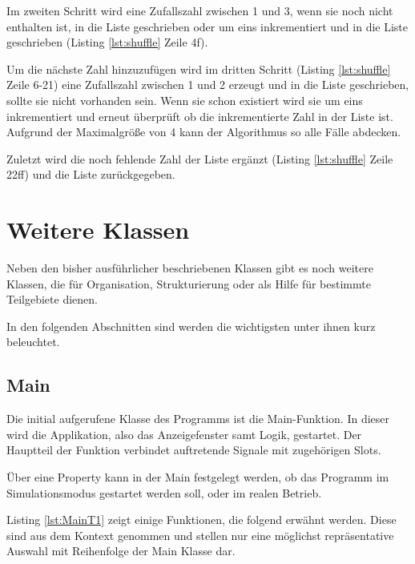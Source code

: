 Im zweiten Schritt wird eine Zufallszahl zwischen 1 und 3, wenn sie noch nicht enthalten ist, in die Liste geschrieben oder um eins inkrementiert und in die Liste geschrieben (Listing \ref{lst:shuffle} Zeile 4f). 

Um die nächste Zahl hinzuzufügen wird im dritten Schritt (Listing \ref{lst:shuffle} Zeile 6-21) eine Zufallszahl zwischen 1 und 2 erzeugt und in die Liste geschrieben, sollte sie nicht vorhanden sein. Wenn sie schon existiert wird sie um eins inkrementiert und erneut überprüft ob die inkrementierte Zahl in der Liste ist. Aufgrund der Maximalgröße von 4 kann der Algorithmus so alle Fälle abdecken.
 
Zuletzt wird die noch fehlende Zahl der Liste ergänzt (Listing \ref{lst:shuffle} Zeile 22ff) und die Liste zurückgegeben. 

\section{Weitere Klassen}

Neben den bisher ausführlicher beschriebenen Klassen gibt es noch weitere Klassen, die für Organisation, Strukturierung oder als Hilfe für bestimmte Teilgebiete dienen. 

In den folgenden Abschnitten sind werden die wichtigsten unter ihnen kurz beleuchtet.

\subsection{Main}
\label{sec:Main}

Die initial aufgerufene Klasse des Programms ist die Main-Funktion. In dieser wird die Applikation, also das Anzeigefenster samt Logik, gestartet. Der Hauptteil der Funktion verbindet auftretende Signale mit zugehörigen Slots. 

Über eine Property kann in der Main festgelegt werden, ob das Programm im Simulationsmodus gestartet werden soll, oder im realen Betrieb. 

Listing \ref{lst:MainT1} zeigt einige Funktionen, die folgend erwähnt werden. Diese sind aus dem Kontext genommen und stellen nur eine möglichst repräsentative Auswahl mit Reihenfolge der Main Klasse dar. 

